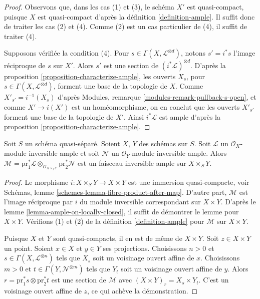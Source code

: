 \begin{proof}
Observons que, dans les cas (1) et (3), le schéma $X'$ est quasi-compact,
puisque $X$ est quasi-compact d'après la définition \ref{definition-ample}.
Il suffit donc de traiter les cas (2) et (4). Comme (2) est un cas
particulier de (4), il suffit de traiter (4).

\medskip\noindent
Supposons vérifiée la condition (4). Pour $s \in \Gamma(X, \mathcal{L}^{\otimes d})$,
notons $s' = i^*s$ l'image réciproque de $s$ sur $X'$. Alors
$s'$ est une section de $(i^*\mathcal{L})^{\otimes d}$.
D'après la proposition \ref{proposition-characterize-ample},
les ouverts $X_s$, pour $s \in \Gamma(X, \mathcal{L}^{\otimes d})$,
forment une base de la topologie de $X$. Comme $X'_{s'} = i^{-1}(X_s)$ d'après
Modules, remarque \ref{modules-remark-pullback-s-open},
et comme $X' \to i(X')$ est un homéomorphisme, on en conclut que
les ouverts $X'_{s'}$ forment une base de la topologie de $X'$. Ainsi
$i^*\mathcal{L}$ est ample
d'après la proposition \ref{proposition-characterize-ample}.
\end{proof}

\begin{lemma}
\label{lemma-ample-on-product}
Soit $S$ un schéma quasi-séparé. Soient $X$, $Y$ des schémas sur $S$.
Soit $\mathcal{L}$ un $\mathcal{O}_X$-module
inversible ample et soit $\mathcal{N}$ un $\mathcal{O}_Y$-module inversible
ample. Alors $\mathcal{M} = \text{pr}_1^*\mathcal{L}
\otimes_{\mathcal{O}_{X \times_S Y}} \text{pr}_2^*\mathcal{N}$
est un faisceau inversible ample sur $X \times_S Y$.
\end{lemma}

\begin{proof}
Le morphisme $i : X \times_S Y \to X \times Y$ est une immersion
quasi-compacte, voir Schémas, lemme \ref{schemes-lemma-fibre-product-after-map}.
D'autre part, $\mathcal{M}$ est l'image réciproque par
$i$ du module inversible correspondant sur $X \times Y$.
D'après le lemme \ref{lemma-ample-on-locally-closed}, il suffit de démontrer le
lemme pour $X \times Y$. Vérifions (1) et (2) de la
définition \ref{definition-ample} pour $\mathcal{M}$ sur $X \times Y$.

\medskip\noindent
Puisque $X$ et $Y$ sont quasi-compacts, il en est de même de $X \times Y$.
Soit $z \in X \times Y$ un point. Soient $x \in X$ et $y \in Y$
ses projections. Choisissons $n > 0$ et
$s \in \Gamma(X, \mathcal{L}^{\otimes n})$
tels que $X_s$ soit un voisinage ouvert affine de $x$.
Choisissons $m > 0$ et
$t \in \Gamma(Y, \mathcal{N}^{\otimes m})$
tels que $Y_t$ soit un voisinage ouvert affine de $y$.
Alors $r = \text{pr}_1^*s \otimes \text{pr}_2^*t$ est une section
de $\mathcal{M}$ avec $(X \times Y)_r = X_s \times Y_t$.
C'est un voisinage ouvert affine de $z$, ce qui achève la démonstration.
\end{proof}












